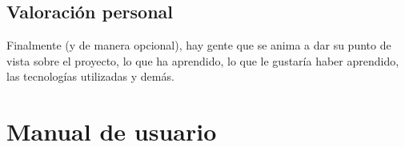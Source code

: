\documentclass[a4paper, 17pt]{book}
\begin{document}
\section{Valoración personal}
\label{sec:valoracion}

Finalmente (y de manera opcional), hay gente que se anima a dar su punto de
vista sobre el proyecto, lo que ha aprendido, lo que le gustaría haber aprendido,
las tecnologías utilizadas y demás.




\cleardoublepage
\appendix
\chapter{Manual de usuario}
\label{app:manual}



\cleardoublepage


\end{document}
